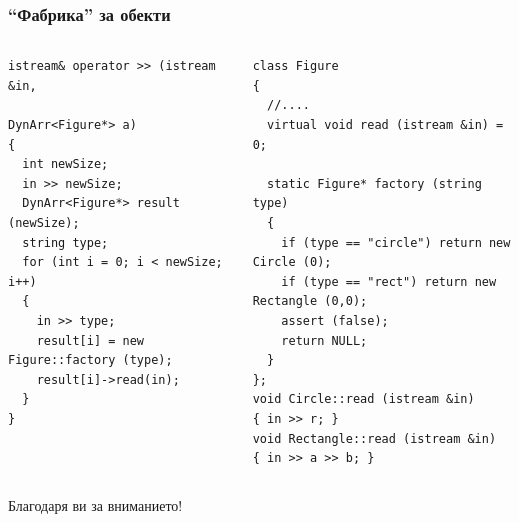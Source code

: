 \documentclass{beamer}
\begin{document}
\begin{frame}[fragile]
\frametitle{``Фабрика'' за обекти}



\begin{columns}[t]
  \begin{column}{0.5\textwidth}
\begin{flushleft}
\begin{lstlisting}
istream& operator >> (istream &in, 
                      DynArr<Figure*> a)
{
  int newSize; 
  in >> newSize; 
  DynArr<Figure*> result (newSize);
  string type;
  for (int i = 0; i < newSize; i++)
  {
    in >> type;
    result[i] = new Figure::factory (type); 
    result[i]->read(in);
  }
}
\end{lstlisting}  
\end{flushleft}
  \end{column}
  \begin{column}{0.5\textwidth}
\begin{flushleft}
\begin{lstlisting}
class Figure
{
  //....
  virtual void read (istream &in) = 0;
  
  static Figure* factory (string type)
  {
    if (type == "circle") return new Circle (0);
    if (type == "rect") return new Rectangle (0,0);
    assert (false);
    return NULL;
  }
};
void Circle::read (istream &in)
{ in >> r; }
void Rectangle::read (istream &in)
{ in >> a >> b; }
\end{lstlisting}  
\end{flushleft}

  \end{column}
\end{columns}


\end{frame}


\begin{frame}
\centerline{Благодаря ви за вниманието!}
\end{frame}
\end{document}

